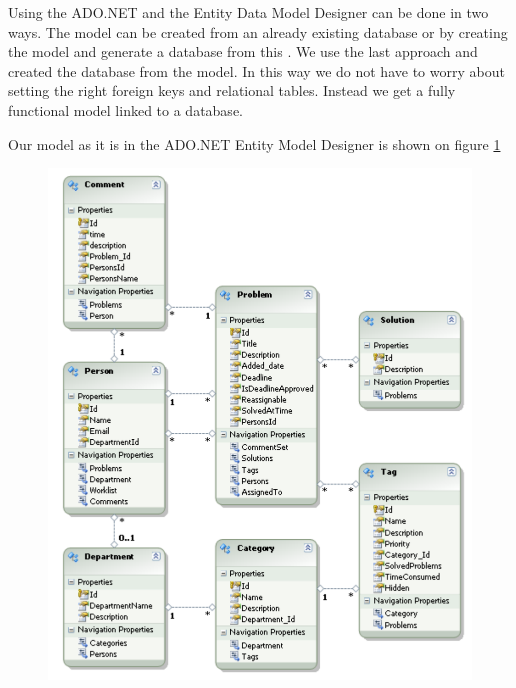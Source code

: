 Using the ADO.NET and the Entity Data Model Designer can be done in two ways. 
The  model can be created from an already existing database or by creating the model and generate a database from this \cite{adonetEntityDataModelDesigner}.
We use the last approach and created the database from the model. 
In this way we do not have to worry about setting the right foreign keys and relational tables. Instead we get a fully functional model linked to a database. 

Our model as it is in the ADO.NET Entity Model Designer is shown on figure \ref{fig:edmxModel}
\begin{figure}[htb]
	\centering
		\includegraphics[scale=0.7]{input/implementation/mvc/Model.pdf}
	\label{fig:edmxModel}
\end{figure}

